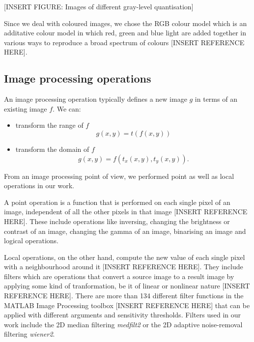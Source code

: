 [INSERT FIGURE: Images of different gray-level quantisation]


Since we deal with coloured images, we chose the RGB colour model which is an additative colour model in which red, green and blue light are added together in various ways to reproduce a broad spectrum of colours [INSERT REFERENCE HERE].


\subsection{Image processing operations}

An image processing operation typically defines a new image \( g \) in terms of an existing image \( f \).
We can: 
\begin{itemize}
	\item transform the range of \( f \)
	\[ 
	g(x, y) = t(f(x,y)) 
	\]
	\item transform the domain of \( f \)
	\[
	g(x,y) = f(t_{x}(x,y), t_{y}(x,y)).
	\]
\end{itemize}


From an image processing point of view, we performed point as well as local operations in our work.

A point operation is a function that is performed on each single pixel of an image, independent of all the other pixels in that image [INSERT REFERENCE HERE]. These include operations like inversing, changing the brightness or contrast of an image, changing the gamma of an image, binarising an image and logical operations. 

Local operations, on the other hand, compute the new value of each single pixel with a neighbourhood around it [INSERT REFERENCE HERE]. %
They include filters which are operations that convert a source image to a result image by applying some kind of tranformation, be it of linear or nonlinear nature [INSERT REFERENCE HERE]. There are more than 134 different filter functions in the MATLAB Image Processing toolbox [INSERT REFERENCE HERE] that can be applied with different arguments and sensitivity thresholds. Filters used in our work include the 2D median filtering \textit{medfilt2} or the 2D adaptive noise-removal filtering \textit{wiener2}.


